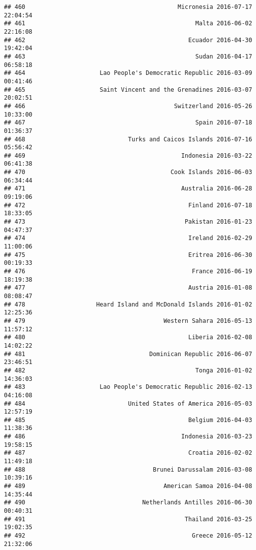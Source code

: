 \documentclass[
]{article}
\begin{document}
\begin{verbatim}
## 460                                           Micronesia 2016-07-17 22:04:54
## 461                                                Malta 2016-06-02 22:16:08
## 462                                              Ecuador 2016-04-30 19:42:04
## 463                                                Sudan 2016-04-17 06:58:18
## 464                     Lao People's Democratic Republic 2016-03-09 00:41:46
## 465                     Saint Vincent and the Grenadines 2016-03-07 20:02:51
## 466                                          Switzerland 2016-05-26 10:33:00
## 467                                                Spain 2016-07-18 01:36:37
## 468                             Turks and Caicos Islands 2016-07-16 05:56:42
## 469                                            Indonesia 2016-03-22 06:41:38
## 470                                         Cook Islands 2016-06-03 06:34:44
## 471                                            Australia 2016-06-28 09:19:06
## 472                                              Finland 2016-07-18 18:33:05
## 473                                             Pakistan 2016-01-23 04:47:37
## 474                                              Ireland 2016-02-29 11:00:06
## 475                                              Eritrea 2016-06-30 00:19:33
## 476                                               France 2016-06-19 18:19:38
## 477                                              Austria 2016-01-08 08:08:47
## 478                    Heard Island and McDonald Islands 2016-01-02 12:25:36
## 479                                       Western Sahara 2016-05-13 11:57:12
## 480                                              Liberia 2016-02-08 14:02:22
## 481                                   Dominican Republic 2016-06-07 23:46:51
## 482                                                Tonga 2016-01-02 14:36:03
## 483                     Lao People's Democratic Republic 2016-02-13 04:16:08
## 484                             United States of America 2016-05-03 12:57:19
## 485                                              Belgium 2016-04-03 11:38:36
## 486                                            Indonesia 2016-03-23 19:58:15
## 487                                              Croatia 2016-02-02 11:49:18
## 488                                    Brunei Darussalam 2016-03-08 10:39:16
## 489                                       American Samoa 2016-04-08 14:35:44
## 490                                 Netherlands Antilles 2016-06-30 00:40:31
## 491                                             Thailand 2016-03-25 19:02:35
## 492                                               Greece 2016-05-12 21:32:06

\end{verbatim}
\end{document}
